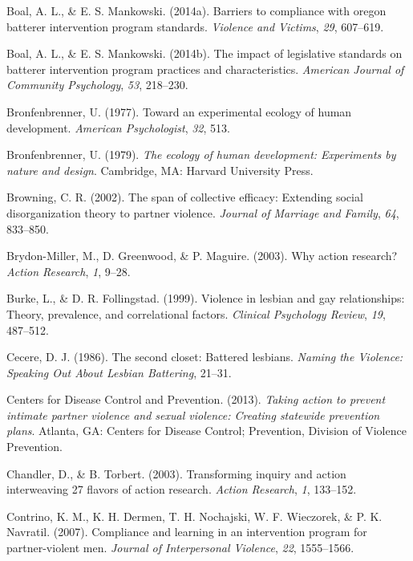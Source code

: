 \documentclass[11pt,]{tufte-book}
\begin{document}
\hypertarget{ref-boal2014barriers}{}
Boal, A. L., \& E. S. Mankowski. (2014a). Barriers to compliance with
oregon batterer intervention program standards. \emph{Violence and
Victims}, \emph{29}, 607--619.

\hypertarget{ref-boal2014impact}{}
Boal, A. L., \& E. S. Mankowski. (2014b). The impact of legislative
standards on batterer intervention program practices and
characteristics. \emph{American Journal of Community Psychology},
\emph{53}, 218--230.

\hypertarget{ref-bronfenbrenner1977toward}{}
Bronfenbrenner, U. (1977). Toward an experimental ecology of human
development. \emph{American Psychologist}, \emph{32}, 513.

\hypertarget{ref-bronfenbrenner1979ecology}{}
Bronfenbrenner, U. (1979). \emph{The ecology of human development:
Experiments by nature and design}. Cambridge, MA: Harvard University
Press.

\hypertarget{ref-browning2002span}{}
Browning, C. R. (2002). The span of collective efficacy: Extending
social disorganization theory to partner violence. \emph{Journal of
Marriage and Family}, \emph{64}, 833--850.

\hypertarget{ref-brydon-miller2003why}{}
Brydon-Miller, M., D. Greenwood, \& P. Maguire. (2003). Why action
research? \emph{Action Research}, \emph{1}, 9--28.

\hypertarget{ref-burke1999violence}{}
Burke, L., \& D. R. Follingstad. (1999). Violence in lesbian and gay
relationships: Theory, prevalence, and correlational factors.
\emph{Clinical Psychology Review}, \emph{19}, 487--512.

\hypertarget{ref-cecere1986second}{}
Cecere, D. J. (1986). The second closet: Battered lesbians. \emph{Naming
the Violence: Speaking Out About Lesbian Battering}, 21--31.

\hypertarget{ref-centers2013taking}{}
Centers for Disease Control and Prevention. (2013). \emph{Taking action
to prevent intimate partner violence and sexual violence: Creating
statewide prevention plans}. Atlanta, GA: Centers for Disease Control;
Prevention, Division of Violence Prevention.

\hypertarget{ref-chandler2003transforming}{}
Chandler, D., \& B. Torbert. (2003). Transforming inquiry and action
interweaving 27 flavors of action research. \emph{Action Research},
\emph{1}, 133--152.

\hypertarget{ref-contrino2007compliance}{}
Contrino, K. M., K. H. Dermen, T. H. Nochajski, W. F. Wieczorek, \& P.
K. Navratil. (2007). Compliance and learning in an intervention program
for partner-violent men. \emph{Journal of Interpersonal Violence},
\emph{22}, 1555--1566.
\end{document}
